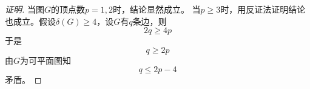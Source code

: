 \begin{proof}[证明]
    当图$G$的顶点数$p=1,2$时，结论显然成立。
  当$p \geq 3$时，用反证法证明结论也成立。假设$\delta (G) \geq 4$，设$G$有$q$条边，则
  \[2q \geq 4p\]
  于是\[q \geq 2p\]
  由$G$为可平面图知
  \[q \leq 2p - 4\]
矛盾。  
\end{proof}
